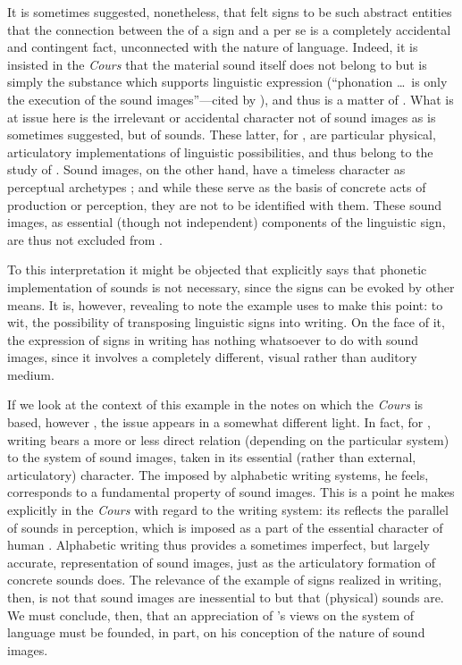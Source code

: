 It is sometimes suggested, nonetheless, that {\Saussure} felt signs to be
such abstract entities that the connection between the \emph{} of a
sign and a  per se is a completely accidental and
contingent fact, unconnected with the nature of language. Indeed, it
is insisted in the \textsl{Cours} that the material sound itself does
not belong to \emph{} but is simply the substance which supports
linguistic expression (``phonation \ldots\ is only the execution of
the sound images''—cited by \citealt[82]{godel57:sources}), and thus is
a matter of \emph{}. What is at issue here is the irrelevant or
accidental character not of sound images as is sometimes suggested,
but of sounds. These latter, for {\Saussure}, are particular physical,
articulatory implementations of linguistic possibilities, and thus
belong to the study of \emph{}. Sound images, on the other hand, have a
timeless character as perceptual archetypes
\citep[98]{saussure16:cours-original}; and while these serve as the
basis of concrete acts of production or perception, they are not to be
identified with them. These sound images, as essential (though not
independent) components of the linguistic sign, are thus not excluded
from \emph{}.

To this interpretation it might be objected that {\Saussure} explicitly
says that phonetic implementation of sounds is not necessary, since
the signs can be e\-voked by other means. It is, however, revealing to
note the example {\Saussure} uses to make this point: to wit, the
possibility of transposing linguistic signs into writing. On the face
of it, the expression of signs in writing has nothing whatsoever to do
with sound images, since it involves a completely different, visual
rather than auditory medium.

If we look at the context of this example in the notes on which the
\textsl{Cours} is based, however \citep[193f.]{godel57:sources}, the
issue appears in a somewhat different light. In fact, for {\Saussure},
writing bears a more or less direct relation (depending on the
particular system) to the system of sound images, taken in its
essential (rather than external, articulatory) character. The
 imposed by alphabetic writing systems, he feels,
corresponds to a fundamental property of sound images. This is a point
he makes explicitly in the \textsl{Cours} with regard to the 
writing system: its  reflects the parallel  of
sounds in perception, which is imposed as a part of the essential
character of human . Alphabetic writing thus provides
a sometimes imperfect, but largely accurate, representation of sound
images, just as the articulatory formation of concrete sounds
does. The relevance of the example of signs realized in writing, then,
is not that sound images are inessential to \emph{} but that (physical)
sounds are. We must conclude, then, that an appreciation of {\Saussure}'s
views on the system of language must be founded, in part, on his
conception of the nature of sound images.

